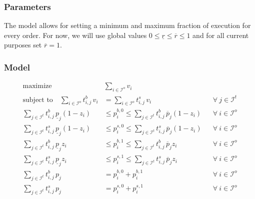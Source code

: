 \documentclass[11pt,parskip=full]{scrartcl}%
\newcommand*{\itokens}{\mathcal{I}^t}       %
\newcommand*{\iorders}{\mathcal{I}^o}       %
\begin{document}
\subsubsection*{Parameters}

The model allows for setting a minimum and maximum fraction of execution for every order.
For now, we will use global values $ 0 \le \underline{r} \le \overline{r} \le 1 $ and for all
current purposes set $ \overline{r} = 1 $.


\subsubsection*{Model}

\begin{subequations}
\begin{align}
  \text{maximize} \quad & \sum\limits_{i \in \iorders} v_i
  \label{eq:mip_objective}
  \\[4mm]
  \text{subject to} \quad
  \sum\limits_{i \in \iorders} t^b_{i,j} \, v_i
  &= \sum\limits_{i \in \iorders} t^s_{i,j} \, v_i
  && \forall \> j \in \itokens
  \label{eq:mip_tokenbalance}
  \\[4mm]
  \sum\limits_{j \in \itokens} t^b_{i,j} \, \underline{p}_j (1-z_i)
  &\le p_i^{b,0} \le  \sum\limits_{j \in \itokens} t^b_{i,j} \, \overline{p}_j (1-z_i)
  && \forall \> i \in \iorders
  \label{eq:mip_bounds_buyprice_0}
  \\[1mm]
  \sum\limits_{j \in \itokens} t^s_{i,j} \, \underline{p}_j (1-z_i)
  &\le p_i^{s,0} \le  \sum\limits_{j \in \itokens} t^s_{i,j} \, \overline{p}_j (1-z_i)
  && \forall \> i \in \iorders
  \label{eq:mip_bounds_sellprice_0}
  \\[1mm]
  \sum\limits_{j \in \itokens} t^b_{i,j} \, \underline{p}_j z_i
  &\le p_i^{b,1} \le  \sum\limits_{j \in \itokens} t^b_{i,j} \, \overline{p}_j z_i
  && \forall \> i \in \iorders
  \label{eq:mip_bounds_buyprice_1}
  \\[1mm]
  \sum\limits_{j \in \itokens} t^s_{i,j} \, \underline{p}_j z_i
  &\le p_i^{s,1} \le  \sum\limits_{j \in \itokens} t^s_{i,j} \, \overline{p}_j z_i
  && \forall \> i \in \iorders
  \label{eq:mip_bounds_sellprice_1}
  \\[4mm]
  \sum\limits_{j \in \itokens} t^b_{i,j} \, p_j
  &= p_i^{b,0} + p_i^{b,1}
  && \forall \> i \in \iorders
  \label{eq:mip_aggr_buyprice}
  \\[1mm]
  \sum\limits_{j \in \itokens} t^s_{i,j} \, p_j
  &= p_i^{s,0} + p_i^{s,1}
  && \forall \> i \in \iorders
  \label{eq:mip_aggr_sellprice}

\end{align}
\end{subequations}
\end{document}
